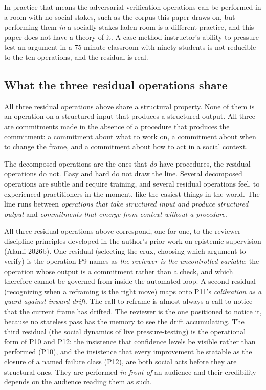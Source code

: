 \documentclass[
  11pt,
]{article}
\begin{document}
In practice that means the adversarial verification operations can be
performed in a room with no social stakes, such as the corpus this paper
draws on, but performing them \emph{in} a socially stakes-laden room is a
different practice, and this paper does not have a theory of it. A
case-method instructor's ability to pressure-test an argument in a
75-minute classroom with ninety students is not reducible to the ten
operations, and the residual is real.

\subsection{What the three residual operations share}\label{the-shape-of-the-residual}

All three residual operations above share a structural property. None of
them is an operation on a structured input that produces a structured
output. All three are commitments made in the absence of a procedure that
produces the commitment: a commitment about what to work on, a commitment
about when to change the frame, and a commitment about how to act in a
social context.

The decomposed operations are the ones that \emph{do} have procedures, the
residual operations do not. Easy and hard do not draw the line. Several
decomposed operations are subtle and require training, and several
residual operations feel, to experienced practitioners in the moment, like
the easiest things in the world. The line runs between \emph{operations
that take structured input and produce structured output} and
\emph{commitments that emerge from context without a procedure}.

All three residual operations above correspond, one-for-one, to the
reviewer-discipline principles developed in the author's prior work on
epistemic supervision (Alami 2026b). One residual (selecting the
crux, choosing which argument to verify) is the operation P9
names as \emph{the reviewer is the uncontrolled variable}: the operation
whose output is a commitment rather than a check, and which therefore
cannot be governed from inside the automated loop. A second residual
(recognizing when a reframing is the right move) maps onto P11's
\emph{calibration as a guard against inward drift}. The call to reframe is
almost always a call to notice that the current frame has drifted. The
reviewer is the one positioned to notice it, because no stateless pass has
the memory to see the drift accumulating. The third residual (the social
dynamics of live pressure-testing) is the operational form of P10 and P12:
the insistence that confidence levels be visible rather than performed
(P10), and the insistence that every improvement be statable as the
closure of a named failure class (P12), are both social acts before they
are structural ones. They are performed \emph{in front of} an audience and
their credibility depends on the audience reading them as such.
\end{document}
